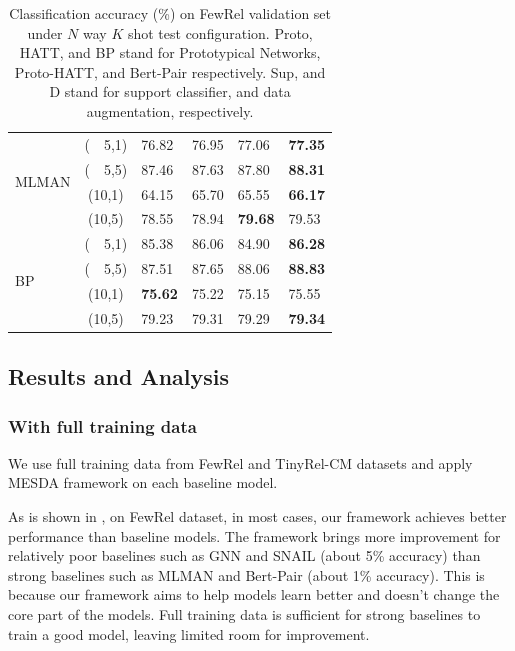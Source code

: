 \begin{table}[ht]
\begin{tabular}{|l|c|p{25pt}<{\centering}|p{25pt}<{\centering}|p{25pt}<{\centering}|p{25pt}<{\centering}|}
\multirow{4}{*}{MLMAN} & (~~5,1) &76.82\footnotemark[3]&76.95&77.06&\textbf{77.35}\\
& (~~5,5) &87.46\footnotemark[3]&87.63&87.80&\textbf{88.31} \\
& (10,1) &64.15\footnotemark[3]&65.70&65.55&\textbf{66.17}\\
& (10,5) &78.55\footnotemark[3]&78.94&\textbf{79.68}&79.53 \\ \hline

\multirow{4}{*}{BP} & (~~5,1) &85.38&86.06&84.90&\textbf{86.28}\\
& (~~5,5) &87.51&87.65&88.06&\textbf{88.83} \\
& (10,1) &\textbf{75.62}&75.22&75.15&75.55\\
& (10,5) &79.23&79.31&79.29&\textbf{79.34} \\ \hline

\end{tabular}
\caption{Classification accuracy (\%) on FewRel validation set under $N$ way $K$ shot test configuration. Proto, HATT, and BP stand for Prototypical Networks, Proto-HATT, and Bert-Pair respectively. Sup, and D stand for support classifier, and data augmentation, respectively.}
\label{FewRelvalAll}
\end{table}


\subsection{Results and Analysis}
\label{results}

\subsubsection{With full training data}

We use full training data from FewRel and TinyRel-CM datasets and apply MESDA framework on each baseline model.

As is shown in , on FewRel dataset, in most cases, our framework achieves better performance than baseline models.
The framework brings more improvement for relatively poor baselines such as GNN and SNAIL (about 5\% accuracy) than strong baselines such as MLMAN and Bert-Pair (about 1\% accuracy). This is because our framework aims to help models learn better and doesn't change the core part of the models. Full training data is sufficient for strong baselines to train a good model, leaving limited room for improvement.


